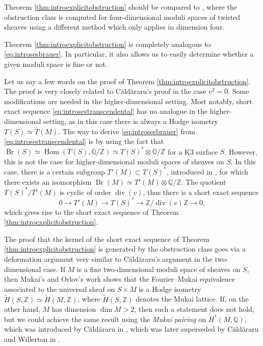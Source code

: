 \documentclass[11pt,twoside]{amsart}
\numberwithin{equation}{section}
\theoremstyle{definition}
\theoremstyle{plain}
\newcommand{\Z}{\ensuremath{\mathbb{Z}}}
\newcommand{\Q}{\ensuremath{\mathbb{Q}}}
\def\Br{\operatorname{Br}}
\def\dv{\operatorname{div}}
\begin{document}
Theorem \ref{thm:introexplicitobstruction} should be compared to \cite[Proposition 6.6]{KK24}, where the obstruction class is computed for four-dimensional moduli spaces of twisted sheaves using a different method which only applies in dimension four.

Theorem \ref{thm:introexplicitobstruction} is completely analogous to \eqref{eq:introsesbrauer}. In particular, it also allows us to easily determine whether a given moduli space is fine or not. 


Let us say a few words on the proof of Theorem \ref{thm:introexplicitobstruction}. The proof is very closely related to C\u ald\u araru's proof in the case $v^2=0$. Some modifications are needed in the higher-dimensional setting. Most notably, short exact sequence \eqref{eq:introsestranscendental} has no analogue in the higher-dimensional setting, as in this case there is always a Hodge isometry $T(S)\simeq T(M)$. The way to derive \eqref{eq:introsesbrauer} from \eqref{eq:introsestranscendental} is by using the fact that $\Br(S)\simeq \operatorname{Hom}(T(S),\Q/\Z) \simeq T(S)^*\otimes \Q/\Z$ for a K3 surface $S$. However, this is not the case for higher-dimensional moduli spaces of sheaves on $S$. In this case, there is a certain subgroup $T'(M)\subset T(S)^*$, introduced in \cite{HM23}, for which there exists an isomorphism $\Br(M)\simeq T'(M)\otimes \Q/\Z$. The quotient $T(S)^*/T'(M)$ is cyclic of order $\dv(v)$, thus there is a short exact sequence $$0\to T'(M)\to T(S)^*\to \Z/\dv(v)\Z\to 0,$$ which gives rise to the short exact sequence of Theorem \ref{thm:introexplicitobstruction}.

The proof that the kernel of the short exact sequence of Theorem \ref{thm:introexplicitobstruction} is generated by the obstruction class goes via a deformation argument very similar to C\u ald\u araru's argument in the two-dimensional case. If $M$ is a fine two-dimensional moduli space of sheaves on $S$, then Mukai's and Orlov's work shows that the Fourier--Mukai equivalence associated to the universal sheaf on $S\times M$ is a Hodge isometry $\tilde{H}(S,\Z)\simeq \tilde{H}(M,\Z)$, where $\tilde{H}(S,\Z)$ denotes the Mukai lattice. If, on the other hand, $M$ has dimension $\dim M>2$, then such a statement does not hold, but we could achieve the same result using the \textit{Mukai pairing} on $H^*(M,\Q)$, which was introduced by C\u ald\u araru in \cite{Cal03}, which was later superseded by C\u ald\u araru and Willerton in \cite{CW10}.
\end{document}
